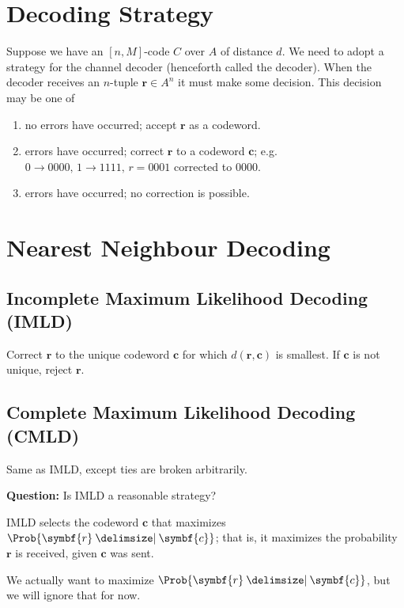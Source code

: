 
\section{Decoding Strategy}
Suppose we have an $ [n,M] $-code $ C $ over $ A $ of distance $ d $.
We need to adopt a strategy for the channel decoder (henceforth called the decoder).
When the decoder receives an $ n $-tuple $ \symbf{r}\in A^n $ it must make some decision.
This decision may be one of
\begin{enumerate}[label=(\roman*)]
    \item no errors have occurred; accept $ \symbf{r} $ as a codeword.
    \item errors have occurred; correct $ \symbf{r} $ to a codeword $ \symbf{c} $;
          e.g. $ 0 \rightarrow 0000,\,1 \rightarrow 1111,\,r=0001 $ corrected to
          $ 0000 $.
    \item errors have occurred; no correction is possible.
\end{enumerate}

\section{Nearest Neighbour Decoding}
\subsection*{Incomplete Maximum Likelihood Decoding (IMLD)}
Correct $ \symbf{r} $ to the unique codeword $ \symbf{c} $ for which
$ d(\symbf{r},\symbf{c}) $ is smallest.
If $ \symbf{c} $ is not unique, reject $ \symbf{r} $.
\subsection*{Complete Maximum Likelihood Decoding (CMLD)}
Same as IMLD, except ties are broken arbitrarily.

\textbf{Question:} Is IMLD a reasonable strategy?

\begin{Theorem}{}{}
    IMLD selects the codeword $ \symbf{c} $ that maximizes $ \Prob{\symbf{r}\given \symbf{c}} $; that is,
    it maximizes the probability $ \symbf{r} $ is received, given $ \symbf{c} $ was sent.
\end{Theorem}

We actually want to maximize $ \Prob{\symbf{r}\given \symbf{c}} $, but we will ignore that for now.

